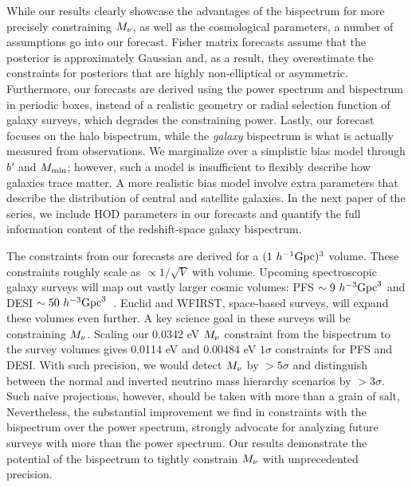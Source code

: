 While our results clearly showcase the advantages of the bispectrum for
more precisely constraining $M_\nu$, as well as the cosmological parameters, 
a number of assumptions go into our forecast. Fisher matrix forecasts assume 
that the posterior is approximately Gaussian and, as a result, they 
overestimate the constraints for posteriors that are highly non-elliptical 
or asymmetric. Furthermore, our forecasts are derived using the power spectrum 
and bispectrum in periodic boxes, instead of a realistic geometry or 
radial selection function of galaxy surveys, which degrades the constraining power. 
Lastly, our forecast
focuses on the halo bispectrum, while the \emph{galaxy} bispectrum is what is 
actually measured from observations. We marginalize over a simplistic bias model 
through $b'$ and $M_{\rm min}$; however, such a model is insufficient to 
flexibly describe how galaxies trace matter. A more realistic bias model 
involve extra parameters that describe the distribution of central and satellite 
galaxies. In the next paper of the series, we include HOD parameters in our
forecasts and quantify the full information content of the redshift-space 
galaxy bispectrum. 

The constraints from our forecasts are derived for a $(1~h^{-1}{\rm Gpc})^3$ 
volume. These constraints roughly scale as $\propto1/\sqrt{V}$ with volume. 
Upcoming spectroscopic galaxy surveys will map out vastly larger cosmic
volumes: PFS $\sim 9~h^{-3}{\rm Gpc}^3$ and DESI $\sim 50~h^{-3}{\rm Gpc}^3$~\citep{takada2014, desicollaboration2016}. 
Euclid and WFIRST, space-based surveys, will expand these volumes even 
further. A key science goal in these surveys will be constraining $M_\nu$. 
Scaling our 0.0342 eV $M_\nu$ constraint from the bispectrum to the survey 
volumes gives 0.0114 eV and 0.00484 eV $1\sigma$ constraints for PFS 
and DESI. With such precision, we would detect $M_\nu$ by $>5\sigma$ and 
distinguish between the normal and inverted neutrino mass hierarchy scenarios 
by $>3\sigma$. Such naive projections, however, should be taken with more than 
a grain of salt, Nevertheless, the substantial improvement we find in 
constraints with the bispectrum over the power spectrum, strongly advocate for 
analyzing future surveys with more than the power spectrum. Our results 
demonstrate the potential of the bispectrum to tightly constrain $M_\nu$ with 
unprecedented precision.
